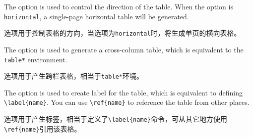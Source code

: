 \vspace{3pt}
\noindent
{}
\vspace{3pt}

\begin{ParaColumn}

    The  option is used to control the direction of the table. When the  option is \verb"horizontal", a single-page horizontal table will be generated.

    \switchcolumn

    选项用于控制表格的方向，当选项为\verb"horizontal"时，将生成单页的横向表格。

\end{ParaColumn}

\vspace{3pt}
\noindent
{}
\vspace{3pt}

\begin{ParaColumn}

    The  option is used to generate a cross-column table, which is equivalent to the \verb"table*" environment.
    
    \switchcolumn

    选项用于产生跨栏表格，相当于\verb"table*"环境。

\end{ParaColumn}

\vspace{3pt}
\noindent
{}
\vspace{3pt}

\begin{ParaColumn}

    The  option is used to create label for the table, which is equivalent to defining \verb"\label{name}". You can use \verb"\ref{name}" to reference the table from other places.

    \switchcolumn

    选项用于产生标签，相当于定义了\verb"\label{name}"命令，可从其它地方使用\verb"\ref{name}"引用该表格。

\end{ParaColumn}

\vspace{3pt}
\noindent
{}
\vspace{3pt}

